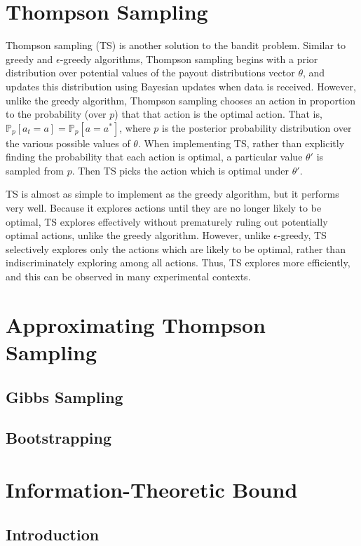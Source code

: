 \documentclass{article}
\newcommand{\eps}{\epsilon}
\newcommand{\p}{\mathbb{P}}
\begin{document}
\section{Thompson Sampling}

Thompson sampling (TS) is another solution to the bandit problem. Similar to greedy and $\eps$-greedy algorithms, Thompson sampling begins with a prior distribution over potential values of the payout distributions vector $\theta$, and updates this distribution using Bayesian updates when data is received. However, unlike the greedy algorithm, Thompson sampling chooses an action in proportion to the probability (over $p$) that that action is the optimal action. That is, $\p_p[a_t = a] = \p_p[a = a^*]$, where $p$ is the posterior probability distribution over the various possible values of $\theta$. When implementing TS, rather than explicitly finding the probability that each action is optimal, a particular value $\theta'$ is sampled from $p$. Then TS picks the action which is optimal under $\theta'$.

TS is almost as simple to implement as the greedy algorithm, but it performs very well. Because it explores actions until they are no longer likely to be optimal, TS explores effectively without prematurely ruling out potentially optimal actions, unlike the greedy algorithm. However, unlike $\eps$-greedy, TS selectively explores only the actions which are likely to be optimal, rather than indiscriminately exploring among all actions. Thus, TS explores more efficiently, and this can be observed in many experimental contexts.

\section{Approximating Thompson Sampling}

\subsection{Gibbs Sampling}
\subsection{Bootstrapping}

\section{Information-Theoretic Bound}

\subsection{Introduction}
\end{document}
